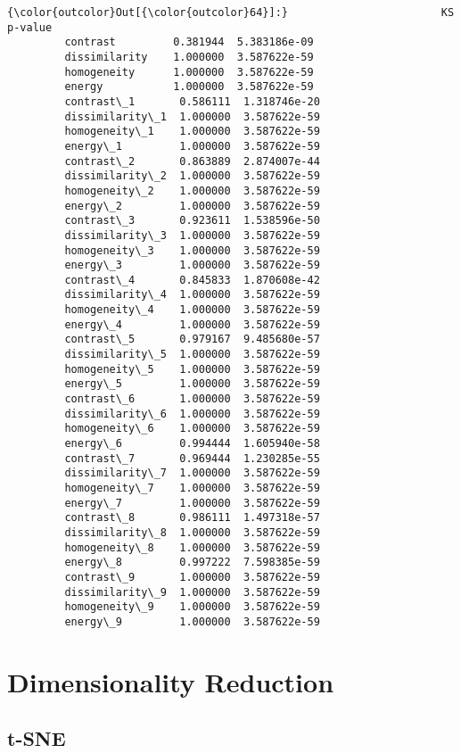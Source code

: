             \begin{Verbatim}[commandchars=\\\{\}]
{\color{outcolor}Out[{\color{outcolor}64}]:}                        KS       p-value
         contrast         0.381944  5.383186e-09
         dissimilarity    1.000000  3.587622e-59
         homogeneity      1.000000  3.587622e-59
         energy           1.000000  3.587622e-59
         contrast\_1       0.586111  1.318746e-20
         dissimilarity\_1  1.000000  3.587622e-59
         homogeneity\_1    1.000000  3.587622e-59
         energy\_1         1.000000  3.587622e-59
         contrast\_2       0.863889  2.874007e-44
         dissimilarity\_2  1.000000  3.587622e-59
         homogeneity\_2    1.000000  3.587622e-59
         energy\_2         1.000000  3.587622e-59
         contrast\_3       0.923611  1.538596e-50
         dissimilarity\_3  1.000000  3.587622e-59
         homogeneity\_3    1.000000  3.587622e-59
         energy\_3         1.000000  3.587622e-59
         contrast\_4       0.845833  1.870608e-42
         dissimilarity\_4  1.000000  3.587622e-59
         homogeneity\_4    1.000000  3.587622e-59
         energy\_4         1.000000  3.587622e-59
         contrast\_5       0.979167  9.485680e-57
         dissimilarity\_5  1.000000  3.587622e-59
         homogeneity\_5    1.000000  3.587622e-59
         energy\_5         1.000000  3.587622e-59
         contrast\_6       1.000000  3.587622e-59
         dissimilarity\_6  1.000000  3.587622e-59
         homogeneity\_6    1.000000  3.587622e-59
         energy\_6         0.994444  1.605940e-58
         contrast\_7       0.969444  1.230285e-55
         dissimilarity\_7  1.000000  3.587622e-59
         homogeneity\_7    1.000000  3.587622e-59
         energy\_7         1.000000  3.587622e-59
         contrast\_8       0.986111  1.497318e-57
         dissimilarity\_8  1.000000  3.587622e-59
         homogeneity\_8    1.000000  3.587622e-59
         energy\_8         0.997222  7.598385e-59
         contrast\_9       1.000000  3.587622e-59
         dissimilarity\_9  1.000000  3.587622e-59
         homogeneity\_9    1.000000  3.587622e-59
         energy\_9         1.000000  3.587622e-59
\end{Verbatim}

    \section{Dimensionality Reduction}\label{dimensionality-reduction}

\subsection{t-SNE}\label{t-sne}

